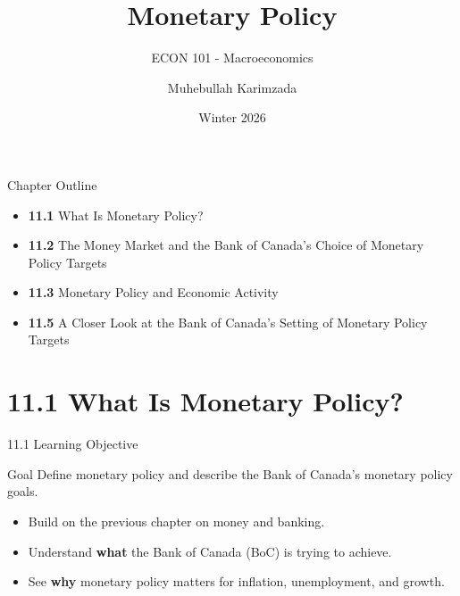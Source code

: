 \documentclass[aspectratio=169]{beamer}
\title{\textbf{Monetary Policy \vspace{.5cm}\\  }}
\subtitle{ {\large ECON 101 - Macroeconomics}}
\author{Muhebullah Karimzada}
\date{Winter 2026}
\begin{document}
\begin{frame}[plain]
  \titlepage
\end{frame}

\begin{frame}{Chapter Outline}
\transfade
\begin{itemize}[<+->]
  \item \textbf{11.1} What Is Monetary Policy?
  \item \textbf{11.2} The Money Market and the Bank of Canada’s Choice of Monetary Policy Targets
  \item \textbf{11.3} Monetary Policy and Economic Activity
  \item \textbf{11.5} A Closer Look at the Bank of Canada’s Setting of Monetary Policy Targets
\end{itemize}
\end{frame}

\section{11.1 What Is Monetary Policy?}

\begin{frame}{11.1 Learning Objective}
\transfade
\begin{block}{Goal}
Define monetary policy and describe the Bank of Canada’s monetary policy goals.
\end{block}
\begin{itemize}[<+->]
  \item Build on the previous chapter on money and banking.
  \item Understand \textbf{what} the Bank of Canada (BoC) is trying to achieve.
  \item See \textbf{why} monetary policy matters for inflation, unemployment, and growth.
\end{itemize}
\end{frame}
\end{document}
